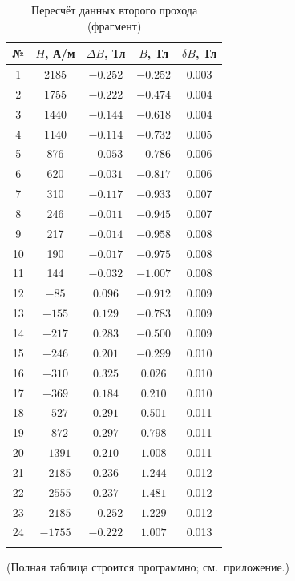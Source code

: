 \documentclass[a4paper]{article}
\begin{document}
\begin{longtable}{|c|c|c|c|c|}
	\hline
	№ & $H$, А/м & $\Delta B$, Тл & $B$, Тл & $\delta B$, Тл \\
	\hline
	1 & 2185 & $-0.252$ & $-0.252$ & 0.003 \\ \hline
	2 & 1755 & $-0.222$ & $-0.474$ & 0.004 \\ \hline
	3 & 1440 & $-0.144$ & $-0.618$ & 0.004 \\ \hline
	4 & 1140 & $-0.114$ & $-0.732$ & 0.005 \\ \hline
	5 & 876 & $-0.053$ & $-0.786$ & 0.006 \\ \hline
	6 & 620 & $-0.031$ & $-0.817$ & 0.006 \\ \hline
	7 & 310 & $-0.117$ & $-0.933$ & 0.007 \\ \hline
	8 & 246 & $-0.011$ & $-0.945$ & 0.007 \\ \hline
	9 & 217 & $-0.014$ & $-0.958$ & 0.008 \\ \hline
	10 & 190 & $-0.017$ & $-0.975$ & 0.008 \\ \hline
	11 & 144 & $-0.032$ & $-1.007$ & 0.008 \\ \hline
	12 & $-85$ & $0.096$ & $-0.912$ & 0.009 \\ \hline
	13 & $-155$ & $0.129$ & $-0.783$ & 0.009 \\ \hline
	14 & $-217$ & $0.283$ & $-0.500$ & 0.009 \\ \hline
	15 & $-246$ & $0.201$ & $-0.299$ & 0.010 \\ \hline
	16 & $-310$ & $0.325$ & $0.026$ & 0.010 \\ \hline
	17 & $-369$ & $0.184$ & $0.210$ & 0.010 \\ \hline
	18 & $-527$ & $0.291$ & $0.501$ & 0.011 \\ \hline
	19 & $-872$ & $0.297$ & $0.798$ & 0.011 \\ \hline
	20 & $-1391$ & $0.210$ & $1.008$ & 0.011 \\ \hline
	21 & $-2185$ & $0.236$ & $1.244$ & 0.012 \\ \hline
	22 & $-2555$ & $0.237$ & $1.481$ & 0.012 \\ \hline
	23 & $-2185$ & $-0.252$ & $1.229$ & 0.012 \\ \hline
	24 & $-1755$ & $-0.222$ & $1.007$ & 0.013 \\ \hline
	\caption{Пересчёт данных второго прохода (фрагмент)}
	\label{tab:BH}
\end{longtable}

(Полная таблица строится программно; см.~приложение.)
\end{document}
